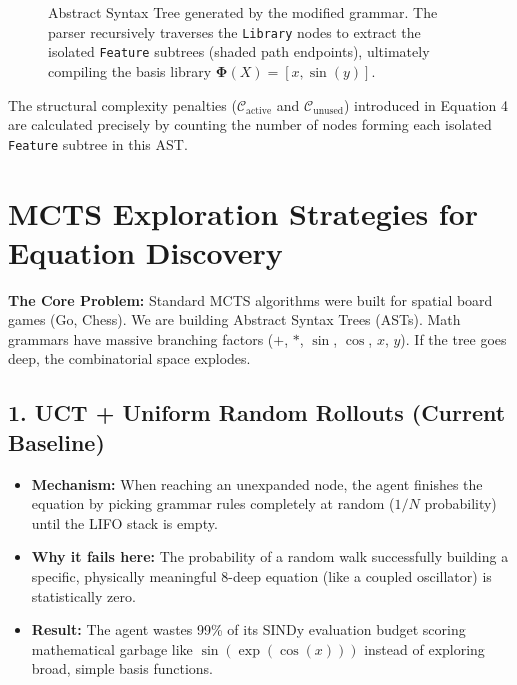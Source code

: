 \documentclass[11pt,a4paper]{article}
\begin{document}
\begin{figure}[htpb]
    \centering
    \caption{Abstract Syntax Tree generated by the modified grammar. The parser recursively traverses the \texttt{Library} nodes to extract the isolated \texttt{Feature} subtrees (shaded path endpoints), ultimately compiling the basis library $\mathbf{\Phi}(X) = [x, \sin(y)]$.}
    \label{fig:ast_example}
\end{figure}

The structural complexity penalties ($\mathcal{C}_{\text{active}}$ and $\mathcal{C}_{\text{unused}}$) introduced in Equation 4 are calculated precisely by counting the number of nodes forming each isolated \texttt{Feature} subtree in this AST.

\section{MCTS Exploration Strategies for Equation Discovery}

\textbf{The Core Problem:} Standard MCTS algorithms were built for spatial board games (Go, Chess). We are building Abstract Syntax Trees (ASTs). Math grammars have massive branching factors ($+$, $*$, $\sin$, $\cos$, $x$, $y$). If the tree goes deep, the combinatorial space explodes.

\subsection*{1. UCT + Uniform Random Rollouts (Current Baseline)}
\begin{itemize}
    \item \textbf{Mechanism:} When reaching an unexpanded node, the agent finishes the equation by picking grammar rules completely at random ($1/N$ probability) until the LIFO stack is empty.
    \item \textbf{Why it fails here:} The probability of a random walk successfully building a specific, physically meaningful 8-deep equation (like a coupled oscillator) is statistically zero. 
    \item \textbf{Result:} The agent wastes 99\% of its SINDy evaluation budget scoring mathematical garbage like $\sin(\exp(\cos(x)))$ instead of exploring broad, simple basis functions.
\end{itemize}
\end{document}
